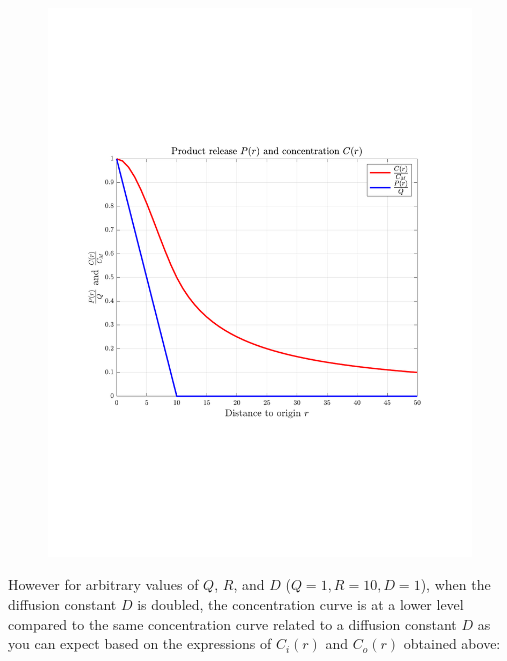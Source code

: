 \documentclass[12pt,twoside]{article}
\begin{document}
\begin{figure}[H]
 \centering
 \includegraphics[scale=0.5]{concentration}
\end{figure}

However for arbitrary values of $Q$, $R$, and $D$ ($Q=1, R=10, D=1$), when the  diffusion constant $D$ is doubled,  the concentration curve is at a lower level
compared to the same concentration curve related to a diffusion constant $D$ as you can expect based on the expressions of $C_i(r)$ and $C_o(r)$ obtained above:
\end{document}
